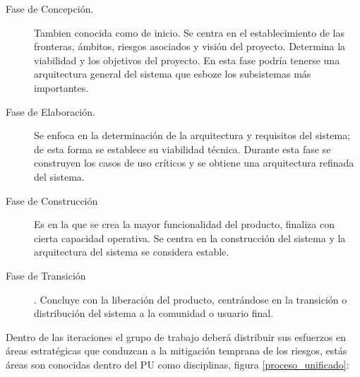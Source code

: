 \begin{description}
\item [Fase de Concepción.] Tambien conocida como de inicio. Se centra en el establecimiento de las fronteras, ámbitos, riesgos asociados y visión del proyecto. Determina la viabilidad y los objetivos del proyecto. En esta fase podría tenerse una arquitectura general del sistema que esboze los subsistemas más importantes.

\item [Fase de Elaboración.] Se enfoca en la determinación de la arquitectura y requisitos del sistema; de esta forma se establece su viabilidad técnica. Durante esta fase se construyen los casos de uso críticos y se obtiene una arquitectura refinada del sistema. 

\item [Fase de Construcción] Es en la que se crea la mayor funcionalidad del producto, finaliza con cierta capacidad operativa. Se centra en la construcción del sistema y la arquitectura del sistema se considera estable.

\item [Fase de Transición]. Concluye con la liberación del producto, centrándose en la transición o distribución del sistema a la comunidad o usuario final. 

\end{description}

Dentro de las iteraciones el grupo de trabajo deberá distribuir sus esfuerzos en áreas estratégicas que conduzcan a la mitigación temprana de los riesgos, estás áreas son conocidas dentro del PU como disciplinas, figura \ref{proceso_unificado}:

